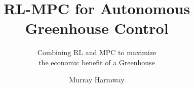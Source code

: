 \documentclass{tudelft-report}
\begin{document}
\frontmatter

\title{RL-MPC for Autonomous Greenhouse Control}
\subtitle{Combining RL and MPC to maximize  \\ the economic benefit of a Greenhouse}
\author{Murray Harraway}

\subject{Systems and Control Masters Thesis} %

\makecover


% 



\tableofcontents




\mainmatter





 


 



\setcounter{biburlnumpenalty}{7000}
\setcounter{biburllcpenalty}{7000}
\setcounter{biburlucpenalty}{7000}

\printbibliography[heading=bibintoc,title=References]


\appendix



\end{document}
